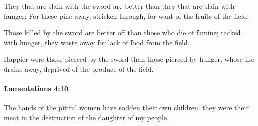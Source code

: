 			\begin{versebox}
					\item[BHS] 
					\item[LXX] 
					\item[ASV] They that are slain with the sword are better than they that are slain with hunger; For these pine away, stricken through, for want of the fruits of the field.
					\item[NIV] Those killed by the sword are better off than those who die of famine; racked with hunger, they waste away for lack of food from the field.
					\item[NRSV] Happier were those pierced by the sword than those pierced by hunger, whose life drains away, deprived of the produce of the field.
			\end{versebox}

		\paragraph{Lamentations 4:10} %
			\label{LAMENTATIONS-4-10}

			The hands of the pitiful women have sodden their own children: they were their meat in the destruction of the daughter of my people.


